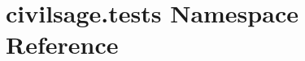 \hypertarget{namespacecivilsage_1_1tests}{}\section{civilsage.\+tests Namespace Reference}
\label{namespacecivilsage_1_1tests}
